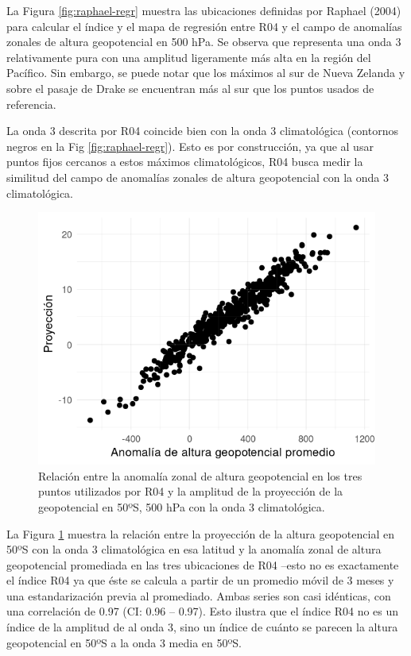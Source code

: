 \documentclass[12pt,oneside,a4paper]{reedthesis}
\begin{document}
La Figura \ref{fig:raphael-regr} muestra las ubicaciones definidas por Raphael (2004) para calcular el índice y el mapa de regresión entre R04 y el campo de anomalías zonales de altura geopotencial en 500 hPa.
Se observa que representa una onda 3 relativamente pura con una amplitud ligeramente más alta en la región del Pacífico.
Sin embargo, se puede notar que los máximos al sur de Nueva Zelanda y sobre el pasaje de Drake se encuentran más al sur que los puntos usados de referencia.

La onda 3 descrita por R04 coincide bien con la onda 3 climatológica (contornos negros en la Fig \ref{fig:raphael-regr}).
Esto es por construcción, ya que al usar puntos fijos cercanos a estos máximos climatológicos, R04 busca medir la similitud del campo de anomalías zonales de altura geopotencial con la onda 3 climatológica.

\begin{figure}

{\centering \includegraphics{figures/15-onda3/pseudo-raphael-1} 

}

\caption{Relación entre la anomalía zonal de altura geopotencial en los tres puntos utilizados por R04 y la amplitud de la proyección de la geopotencial en 50ºS, 500 hPa con la onda 3 climatológica.}\label{fig:pseudo-raphael}
\end{figure}



La Figura \ref{fig:pseudo-raphael} muestra la relación entre la proyección de la altura geopotencial en 50ºS con la onda 3 climatológica en esa latitud y la anomalía zonal de altura geopotencial promediada en las tres ubicaciones de R04 --esto no es exactamente el índice R04 ya que éste se calcula a partir de un promedio móvil de 3 meses y una estandarización previa al promediado.
Ambas series son casi idénticas, con una correlación de 0.97 (CI: 0.96 -- 0.97).
Esto ilustra que el índice R04 no es un índice de la amplitud de al onda 3, sino un índice de cuánto se parecen la altura geopotencial en 50ºS a la onda 3 media en 50ºS.
\end{document}
